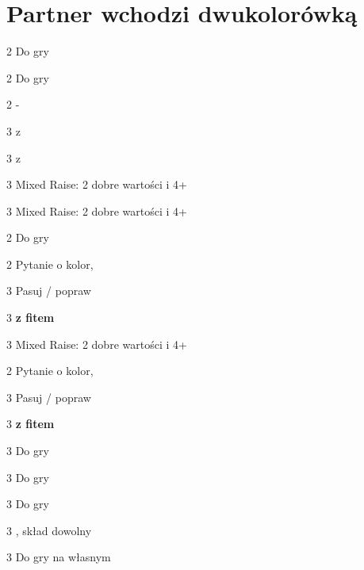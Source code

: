 \documentclass[12pt, a4paper]{article}
\begin{document}
\section*{Partner wchodzi dwukolorówką}

\begin{compoptions}[4]
    \item[2\hearts] Do gry
    \item[2\spades] Do gry 
    \item[2\nt] -
    \item[3\clubs] \invp z \hearts \imp
    \item[3\diams] \invp z \spades \imp
    \item[3\hearts] Mixed Raise: 2 dobre wartości i 4+\hearts
    \item[3\spades] Mixed Raise: 2 dobre wartości i 4+\spades     
\end{compoptions}

\begin{compoptions}[4]
    \item[2\spades] Do gry 
    \item[2\nt] Pytanie o kolor, \invp \imp
    \item[3\clubs] Pasuj / popraw
    \item[3\diams] \invp \textbf{z fitem} \spades \vimp
    \item[3\spades] Mixed Raise: 2 dobre wartości i 4+\spades     
\end{compoptions}

\begin{compoptions}[4]
    \item[2\nt] Pytanie o kolor, \invp \imp
    \item[3\clubs] Pasuj / popraw
    \item[3\diams] \invp \textbf{z fitem} \hearts \vimp
    \item[3\hearts] Do gry
\end{compoptions}

\begin{compoptions}[4]
    \item[3\clubs] Do gry
    \item[3\diams] Do gry
    \item[3\hearts] \gf, skład dowolny
    \item[3\spades] Do gry na własnym  
\end{compoptions}
\end{document}
